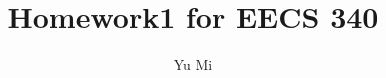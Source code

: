 \documentclass[11pt]{article}
\begin{document}
	\title{Homework1 for EECS 340}
	\author{Yu Mi}
	\maketitle
\end{document}
